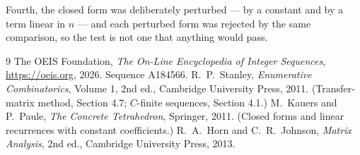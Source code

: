 \documentclass[11pt,a4paper]{article}
\theoremstyle{plain}
\theoremstyle{definition}
\begin{document}
Fourth, the closed form was deliberately perturbed --- by a constant and by a term linear in
$n$ --- and each perturbed form was rejected by the same comparison, so the test is not one
that anything would pass.

\begin{thebibliography}{9}
 The OEIS Foundation, \emph{The On-Line Encyclopedia of Integer
Sequences}, \url{https://oeis.org}, 2026. Sequence A184566.
 R.~P.~Stanley, \emph{Enumerative Combinatorics}, Volume 1, 2nd ed.,
Cambridge University Press, 2011. (Transfer-matrix method, Section 4.7; $C$-finite sequences,
Section 4.1.)
 M.~Kauers and P.~Paule, \emph{The Concrete Tetrahedron}, Springer, 2011.
(Closed forms and linear recurrences with constant coefficients.)
 R.~A.~Horn and C.~R.~Johnson, \emph{Matrix Analysis}, 2nd ed., Cambridge
University Press, 2013.
\end{thebibliography}
\end{document}
